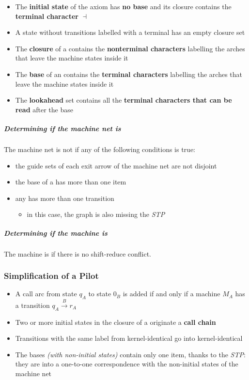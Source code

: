 \documentclass[english]{article}
\begin{document}
\begin{itemize}
  \item The \textbf{initial state} of the axiom has \textbf{no base} and its closure contains the \textbf{terminal character} \(\dashv\)
  \item A state without transitions labelled with a terminal has an empty closure set
  \item The \textbf{closure} of a \mstate contains the \textbf{nonterminal characters} labelling the arches that leave the machine states inside it
  \item The \textbf{base} of an \mstate contains the \textbf{terminal characters} labelling the arches that leave the machine states inside it
  \item The \textbf{lookahead} set contains all the \textbf{terminal characters that can be read} after the \mstate base
\end{itemize}

\subparagraph*[Determining if the machine net is ELL(1)]{Determining if the machine net is \ello}

The machine net is not \ello if any of the following conditions is true:

\begin{itemize}
  \item the guide sets of each exit arrow of the machine net are not disjoint
  \item the base of a \mstate has more than one item
  \item any \mstate has more than one transition
  \begin{itemize}[label=\(\rightarrow\)]
    \item in this case, the graph is also missing the \textit{STP}
  \end{itemize}
\end{itemize}

\subparagraph*[Determining if the machine is ELR(1)]{Determining if the machine is \elro}

The machine is \elro if there is no shift-reduce conflict.

\subsubsection[Simplification of a ELL(1) Pilot]{Simplification of a \ello Pilot}

\begin{itemize}
  \item A call arc from state \(q_A\) to state \(0_B\) is added if and only if a machine \(M_A\) has a transition \(q_A \xrightarrow{B} r_A\)
  \item Two or more initial states in the closure of a \mstate originate a \textbf{call chain}
  \item Transitions with the same label from kernel-identical \mstates go into kernel-identical \mstates
  \item The \mstate bases \textit{(with non-initial states)} contain only one item, thanks to the \textit{STP}: they are into a one-to-one correspondence with the non-initial states of the machine net
\end{itemize}
\end{document}
